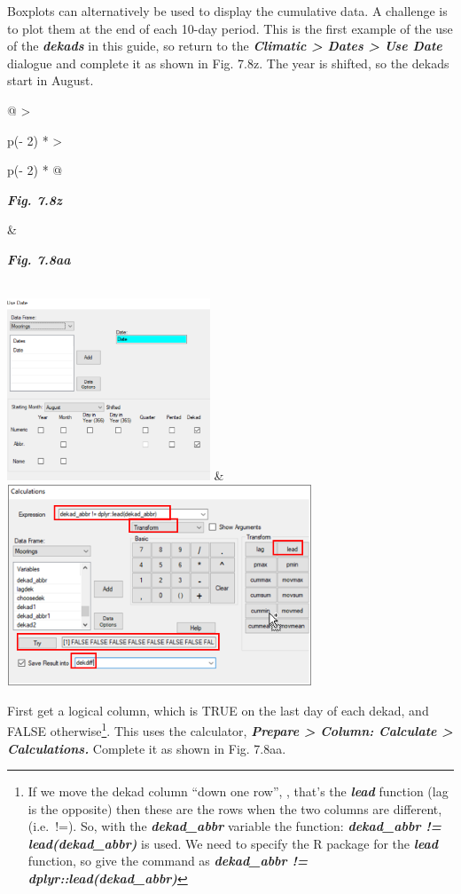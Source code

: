 \documentclass[
  letterpaper,
  DIV=11,
  numbers=noendperiod]{scrreprt}
\begin{document}
Boxplots can alternatively be used to display the cumulative data. A
challenge is to plot them at the end of each 10-day period. This is the
first example of the use of the \textbf{\emph{dekads}} in this guide, so
return to the \textbf{\emph{Climatic \textgreater{} Dates \textgreater{}
Use Date}} dialogue and complete it as shown in Fig. 7.8z. The year is
shifted, so the dekads start in August.

\begin{longtable}[]{@{}
  >{\raggedright\arraybackslash}p{(\columnwidth - 2\tabcolsep) * }
  >{\raggedright\arraybackslash}p{(\columnwidth - 2\tabcolsep) * }@{}}
\toprule\noalign{}
\begin{minipage}[b]{\linewidth}\raggedright
\textbf{\emph{Fig. 7.8z}}
\end{minipage} & \begin{minipage}[b]{\linewidth}\raggedright
\textbf{\emph{Fig. 7.8aa}}
\end{minipage} \\
\midrule\noalign{}
\endhead
\bottomrule\noalign{}
\endlastfoot
\includegraphics[width=2.38318in,height=2.13536in]{figures/Fig7.8z.png}
&
\includegraphics[width=3.59068in,height=2.35815in]{figures/Fig7.8aa.png} \\
\end{longtable}

First get a logical column, which is TRUE on the last day of each dekad,
and FALSE otherwise\footnote{If we move the dekad column ``down one
  row'', , that's the \textbf{\emph{lead}} function (lag is the
  opposite) then these are the rows when the two columns are different,
  (i.e.~!=). So, with the \textbf{\emph{dekad\_abbr}} variable the
  function: \textbf{\emph{dekad\_abbr != lead(dekad\_abbr)}} is used. We
  need to specify the R package for the \textbf{\emph{lead}} function,
  so give the command as \textbf{\emph{dekad\_abbr !=
  dplyr::lead(dekad\_abbr)}}}. This uses the calculator,
\textbf{\emph{Prepare \textgreater{} Column: Calculate \textgreater{}
Calculations.}} Complete it as shown in Fig. 7.8aa.
\end{document}
